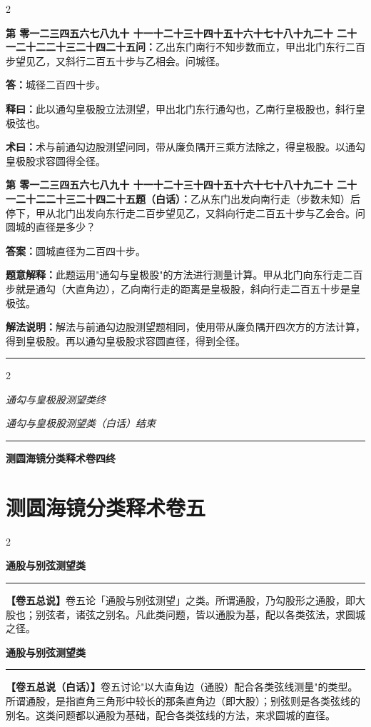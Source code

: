 \documentclass[10pt,a4paper]{article}
\newcommand{\longline}{\noindent\rule{\textwidth}{0.4pt}}
\newcounter{probnum}
\newcounter{probnumvol}[section]
\newcommand{\chnum}[1]{%
  \ifcase#1 零\or 一\or 二\or 三\or 四\or 五\or 六\or 七\or 八\or 九\or 十\or
    十一\or 十二\or 十三\or 十四\or 十五\or 十六\or 十七\or 十八\or 十九\or 二十\or
    二十一\or 二十二\or 二十三\or 二十四\or 二十五\fi}
\newcommand{\problemclassical}[1]{%
  \stepcounter{probnumvol}%
  \par\noindent
  \textcolor{classicalcolor}{\textbf{第\chnum{\value{probnumvol}}问：}}#1\par\smallskip
}
\newcommand{\problemmodern}[1]{%
  \par\noindent
  \textcolor{moderncolor}{\textbf{第\chnum{\value{probnumvol}}题（白话）：}}#1\par\smallskip
}
\newcommand{\answerclassical}[1]{%
  \par\noindent\textcolor{classicalcolor}{\textbf{答：}}#1\par
}
\newcommand{\answermodern}[1]{%
  \par\noindent\textcolor{moderncolor}{\textbf{答案：}}#1\par
}
\newcommand{\shiyiclassical}[1]{%
  \par\noindent\textcolor{classicalcolor}{\textbf{释曰：}}#1\par
}
\newcommand{\shiyimodern}[1]{%
  \par\noindent\textcolor{moderncolor}{\textbf{题意解释：}}#1\par
}
\newcommand{\shuyueclassical}[1]{%
  \par\noindent\textcolor{classicalcolor}{\textbf{术曰：}}#1\par
}
\newcommand{\shuyuemodern}[1]{%
  \par\noindent\textcolor{moderncolor}{\textbf{解法说明：}}#1\par
}
\newcommand{\volheaderclassical}[1]{%
  \begin{center}{\large\bfseries\color{volcolor} #1}\end{center}
  \vspace{0.3cm}
  \longline
  \vspace{0.3cm}
}
\newcommand{\volheadermodern}[1]{%
  \begin{center}{\large\bfseries\color{volcolor} #1}\end{center}
  \vspace{0.3cm}
  \longline
  \vspace{0.3cm}
}
\newcommand{\endclassical}[1]{%
  \vspace{0.3cm}
  \begin{center}\textit{#1}\end{center}
}
\newcommand{\endmodern}[1]{%
  \vspace{0.3cm}
  \begin{center}\textit{#1}\end{center}
}
\begin{document}
\begin{paracol}{2}

\problemclassical{乙出东门南行不知步数而立，甲出北门东行二百步望见乙，又斜行二百五十步与乙相会。问城径。}

\answerclassical{城径二百四十步。}

\shiyiclassical{此以通勾皇极股立法测望，甲出北门东行通勾也，乙南行皇极股也，斜行皇极弦也。}

\shuyueclassical{术与前通勾边股测望问同，带从廉负隅开三乘方法除之，得皇极股。以通勾皇极股求容圆得全径。}

\switchcolumn

\problemmodern{乙从东门出发向南行走（步数未知）后停下，甲从北门出发向东行走二百步望见乙，又斜向行走二百五十步与乙会合。问圆城的直径是多少？}

\answermodern{圆城直径为二百四十步。}

\shiyimodern{此题运用"通勾与皇极股"的方法进行测量计算。甲从北门向东行走二百步就是通勾（大直角边），乙向南行走的距离是皇极股，斜向行走二百五十步是皇极弦。}

\shuyuemodern{解法与前通勾边股测望题相同，使用带从廉负隅开四次方的方法计算，得到皇极股。再以通勾皇极股求容圆直径，得到全径。}

\end{paracol}

\vspace{0.5cm}
\longline
\begin{paracol}{2}
\endclassical{通勾与皇极股测望类终}
\switchcolumn
\endmodern{通勾与皇极股测望类（白话）结束}
\end{paracol}

\vspace{0.5cm}
\longline
\begin{center}
{\Large\bfseries\color{volcolor} 测圆海镜分类释术卷四终}
\end{center}

\newpage


\section{测圆海镜分类释术卷五}
\label{sec:vol5}

\begin{paracol}{2}

\volheaderclassical{通股与别弦测望类}

\noindent\textbf{【卷五总说】}卷五论「通股与别弦测望」之类。所谓通股，乃勾股形之通股，即大股也；别弦者，诸弦之别名。凡此类问题，皆以通股为基，配以各类弦法，求圆城之径。

\switchcolumn

\volheadermodern{通股与别弦测望类}

\noindent\textbf{【卷五总说（白话）】}卷五讨论"以大直角边（通股）配合各类弦线测量"的类型。所谓通股，是指直角三角形中较长的那条直角边（即大股）；别弦则是各类弦线的别名。这类问题都以通股为基础，配合各类弦线的方法，来求圆城的直径。

\end{paracol}
\end{document}
